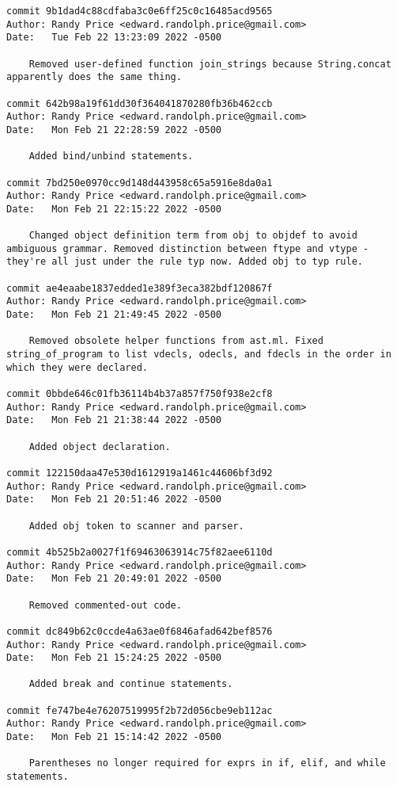 {\begin{verbatim}
commit 9b1dad4c88cdfaba3c0e6ff25c0c16485acd9565
Author: Randy Price <edward.randolph.price@gmail.com>
Date:   Tue Feb 22 13:23:09 2022 -0500

    Removed user-defined function join_strings because String.concat apparently does the same thing.

commit 642b98a19f61dd30f364041870280fb36b462ccb
Author: Randy Price <edward.randolph.price@gmail.com>
Date:   Mon Feb 21 22:28:59 2022 -0500

    Added bind/unbind statements.

commit 7bd250e0970cc9d148d443958c65a5916e8da0a1
Author: Randy Price <edward.randolph.price@gmail.com>
Date:   Mon Feb 21 22:15:22 2022 -0500

    Changed object definition term from obj to objdef to avoid ambiguous grammar. Removed distinction between ftype and vtype - they're all just under the rule typ now. Added obj to typ rule.

commit ae4eaabe1837edded1e389f3eca382bdf120867f
Author: Randy Price <edward.randolph.price@gmail.com>
Date:   Mon Feb 21 21:49:45 2022 -0500

    Removed obsolete helper functions from ast.ml. Fixed string_of_program to list vdecls, odecls, and fdecls in the order in which they were declared.

commit 0bbde646c01fb36114b4b37a857f750f938e2cf8
Author: Randy Price <edward.randolph.price@gmail.com>
Date:   Mon Feb 21 21:38:44 2022 -0500

    Added object declaration.

commit 122150daa47e530d1612919a1461c44606bf3d92
Author: Randy Price <edward.randolph.price@gmail.com>
Date:   Mon Feb 21 20:51:46 2022 -0500

    Added obj token to scanner and parser.

commit 4b525b2a0027f1f69463063914c75f82aee6110d
Author: Randy Price <edward.randolph.price@gmail.com>
Date:   Mon Feb 21 20:49:01 2022 -0500

    Removed commented-out code.

commit dc849b62c0ccde4a63ae0f6846afad642bef8576
Author: Randy Price <edward.randolph.price@gmail.com>
Date:   Mon Feb 21 15:24:25 2022 -0500

    Added break and continue statements.

commit fe747be4e76207519995f2b72d056cbe9eb112ac
Author: Randy Price <edward.randolph.price@gmail.com>
Date:   Mon Feb 21 15:14:42 2022 -0500

    Parentheses no longer required for exprs in if, elif, and while statements.


\end{verbatim}}

